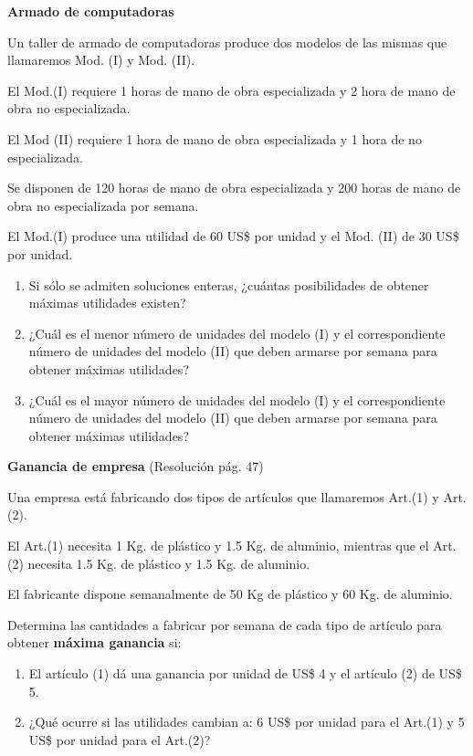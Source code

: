 \begin{Ejer}
\textbf{Armado de computadoras}

Un taller de armado de computadoras produce dos modelos de las mismas que llamaremos Mod. (I) y Mod. (II).

El Mod.(I) requiere 1 horas de mano de obra especializada y 2 hora de mano de obra no especializada.

El Mod (II) requiere 1 hora de mano de obra especializada y 1 hora de no especializada.

Se disponen de 120 horas de mano de obra especializada y 200 horas de mano de obra no especializada por semana.

El Mod.(I) produce una utilidad de 60 US\$ por unidad y el Mod. (II) de 30 US\$ por unidad.

\begin{enumerate}
\item Si s\'olo se admiten soluciones enteras, ¿cu\'antas posibilidades de obtener m\'aximas utilidades existen?
\item ¿Cu\'al es el menor n\'umero de unidades del modelo (I) y el correspondiente n\'umero de unidades del modelo (II) que deben armarse por semana para obtener m\'aximas utilidades?
\item ¿Cu\'al es el mayor n\'umero de unidades del modelo (I) y el correspondiente n\'umero de unidades del modelo (II) que deben armarse por semana para obtener m\'aximas utilidades?
\end{enumerate}
\end{Ejer}

\begin{Ejer}
\textbf{Ganancia de empresa} (Resoluci\'on p\'ag. 47)

Una empresa est\'a fabricando dos tipos de art\'iculos que llamaremos Art.(1) y Art.(2).

El Art.(1) necesita 1 Kg. de pl\'astico y 1.5 Kg. de aluminio, mientras que el Art. (2) necesita 1.5 Kg. de pl\'astico y 1.5 Kg. de aluminio.

El fabricante dispone semanalmente de 50 Kg de pl\'astico y 60 Kg. de aluminio.

Determina las cantidades a fabricar por semana de cada tipo de art\'iculo para obtener \textbf{m\'axima ganancia} si:

\begin{enumerate}
\item El art\'iculo (1) d\'a una ganancia por unidad de US\$ 4 y el art\'iculo (2) de US\$ 5.
\item ¿Qu\'e ocurre si las utilidades cambian a: 6 US\$ por unidad para el Art.(1) y 5 US\$ por unidad para el Art.(2)?
\end{enumerate}
\end{Ejer}


